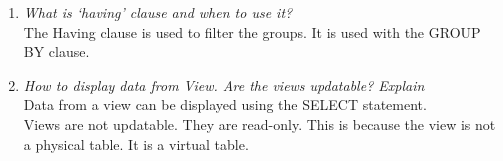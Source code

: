 \documentclass[11pt]{article}
\begin{document}
\begin{enumerate}
\textit{An Example query would be }

\begin{lstlisting}[language=sql]
SELECT column_name, aggregate_function(column_name) from table_name having aggregate_function(column_name) operator value group by column_name;
\end{lstlisting}

\item \textit{What is ‘having’ clause and when to use it?}\\

The Having clause is used to filter the groups. It is used with the GROUP BY clause.\\

\item \textit{How to display data from View. Are the views updatable? Explain}\\

Data from a view can be displayed using the SELECT statement.\\

Views are not updatable. They are read-only. This is because the view is not a physical table. It is a virtual table.\\
\end{enumerate}
\end{document}
